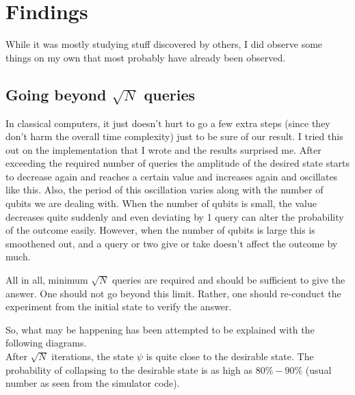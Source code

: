 \documentclass[13pt]{article}
\begin{document}
\section{Findings}
While it was mostly studying stuff discovered by others, I did observe some things on my own that most probably have already been observed.

\subsection{Going beyond $\sqrt{N}$ queries}

In classical computers, it just doesn't hurt to go a few extra steps (since they don't harm the overall time complexity) just to be sure of our result.
I tried this out on the implementation that I wrote and the results surprised me. After exceeding the required number of queries the amplitude of the desired state starts to decrease again and reaches a certain value and increases again and oscillates like this. Also, the period of this oscillation varies along with the number of qubits we are dealing with. When the number of qubits is small, the value decreases quite suddenly and even deviating by 1 query can alter the probability of the outcome easily. However, when the number of qubits is large this is smoothened out, and a query or two give or take doesn't affect the outcome by much.

All in all, minimum $\sqrt{N}$ queries are required and should be sufficient to give the answer. One should not go beyond this limit. Rather, one should re-conduct the experiment from the initial state to verify the answer.

So, what may be happening has been attempted to be explained with the following diagrams.\\
After $\sqrt{N}$ iterations, the state $\psi$ is quite close to the desirable state. The probability of collapsing to the desirable state is as high as $80\% - 90\%$ (usual number as seen from the simulator code).

\end{document}
